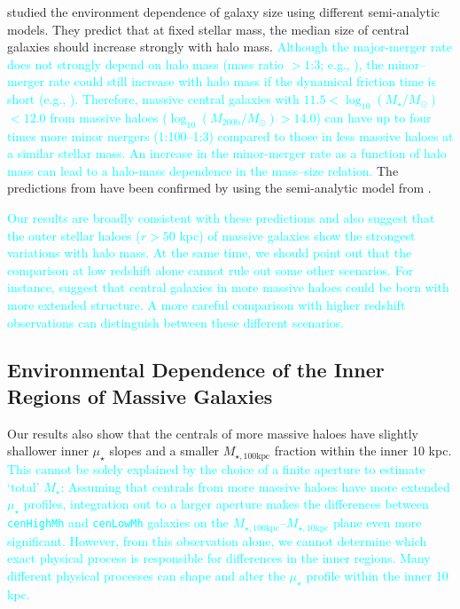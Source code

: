\documentclass[a4paper,fleqn,usenatbib]{mnras}
\def\rbcg{\texttt{cenHighMh}}
\def\nbcg{\texttt{cenLowMh}}
\def\mstar{{$M_{\star}$}}
\def\logms{{$\log_{10} (M_{\star}/M_{\odot})$}}
\def\logmh{{$\log_{10} (M_{\mathrm{200b}}/M_{\odot})$}}
\def\minn{{$M_{\star,10\mathrm{kpc}}$}}
\def\mtot{{$M_{\star,100\mathrm{kpc}}$}}
\def\mden{{$\mu_{\star}$}}
\newcommand{\song}[1]{\textcolor{cyan}{#1}}
\begin{document}
    \citet{Shankar2014} studied the environment dependence of galaxy size using 
    different semi-analytic models. 
    They predict that at fixed stellar mass, the median size of central galaxies 
    should increase strongly with halo mass. 
    \song{
    Although the major-merger rate does not strongly depend on halo mass 
    (mass ratio $>1$:3; e.g., \citealt{Hirschmann2013, Shankar2015}), the 
    minor--merger rate could still increase with halo mass if the dynamical friction
    time is short (e.g., \citealt{Newman2012}). 
    Therefore, massive central galaxies with $11.5 <$\logms{}$<12.0$ from 
    massive haloes (\logmh{}$>14.0$) can have up to four times more minor mergers 
    (1:100--1:3) compared to those in less massive haloes at a similar stellar 
    mass. 
    An increase in the minor-merger rate as a function of halo mass can lead to a 
    halo-mass dependence in the mass--size relation. 
    }
    The predictions from \citet{Shankar2014} have been confirmed by \citet{Yoon2017} 
    using the semi-analytic model from \citet{Guo2011}.  
    
    \song{
    Our results are broadly consistent with these predictions and also suggest that 
    the outer stellar haloes ($r>50$ kpc) of massive galaxies show the strongest 
    variations with halo mass. 
    At the same time, we should point out that the comparison at low redshift alone 
    cannot rule out some other scenarios.  
    For instance, \citet{Buchan2016} suggest that central galaxies in more massive 
    haloes could be born with more extended structure. 
    A more careful comparison with higher redshift observations can distinguish between 
    these different scenarios.
    }
   
\subsection{Environmental Dependence of the Inner Regions of Massive Galaxies}

    Our results also show that the centrals of more massive haloes have slightly 
    shallower inner \mden{} slopes and a smaller \mtot{} fraction within the inner 
    10 kpc.
    \song{
    This cannot be solely explained by the choice of a finite aperture to 
    estimate `total' \mstar{}: Assuming that centrals from more massive haloes 
    have more extended \mden{} profiles, integration out to a larger aperture makes 
    the differences between \rbcg{} and \nbcg{} galaxies on the \mtot{}--\minn{} 
    plane even more significant.
    However, from this observation alone, we cannot determine which exact physical 
    process is responsible for differences in the inner regions. 
    Many different physical processes can shape and alter the \mden{} profile within 
    the inner 10 kpc.
    } 
    
\end{document}
